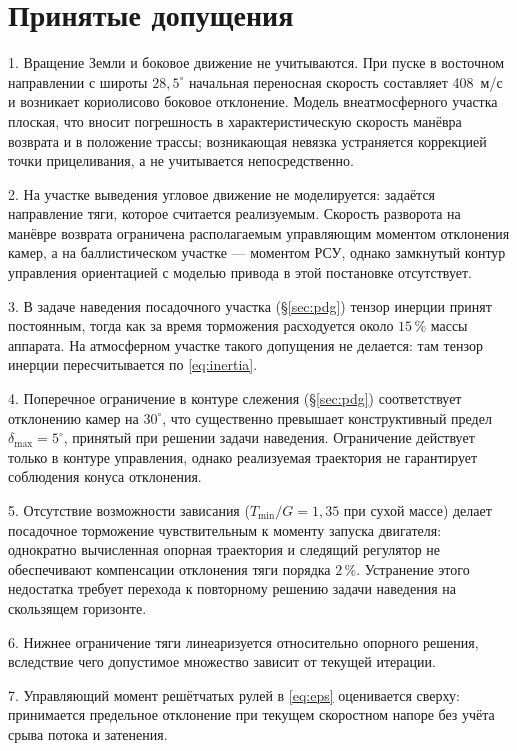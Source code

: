 \documentclass[11pt,a4paper]{article}
\begin{document}
\section{Принятые допущения}

1. Вращение Земли и боковое движение не учитываются. При пуске в восточном
направлении с широты $28{,}5^\circ$ начальная переносная скорость составляет
408~м/с и возникает кориолисово боковое отклонение. Модель внеатмосферного
участка плоская, что вносит погрешность в характеристическую скорость манёвра
возврата и в положение трассы; возникающая невязка устраняется коррекцией точки
прицеливания, а не учитывается непосредственно.

2. На участке выведения угловое движение не моделируется: задаётся направление
тяги, которое считается реализуемым. Скорость разворота на манёвре возврата
ограничена располагаемым управляющим моментом отклонения камер, а на
баллистическом участке — моментом РСУ, однако замкнутый контур управления
ориентацией с моделью привода в этой постановке отсутствует.

3. В задаче наведения посадочного участка (\S\ref{sec:pdg}) тензор инерции принят
постоянным, тогда как за время торможения расходуется около $15\,\%$ массы
аппарата. На атмосферном участке такого допущения не делается: там тензор
инерции пересчитывается по \eqref{eq:inertia}.

4. Поперечное ограничение в контуре слежения (\S\ref{sec:pdg}) соответствует
отклонению камер на $30^\circ$, что существенно превышает конструктивный предел
$\delta_{\max}=5^\circ$, принятый при решении задачи наведения. Ограничение
действует только в контуре управления, однако реализуемая траектория не
гарантирует соблюдения конуса отклонения.

5. Отсутствие возможности зависания ($T_{\min}/G=1{,}35$ при сухой массе) делает
посадочное торможение чувствительным к моменту запуска двигателя: однократно
вычисленная опорная траектория и следящий регулятор не обеспечивают компенсации
отклонения тяги порядка $2\,\%$. Устранение этого недостатка требует перехода к
повторному решению задачи наведения на скользящем горизонте.

6. Нижнее ограничение тяги линеаризуется относительно опорного решения,
вследствие чего допустимое множество зависит от текущей итерации.

7. Управляющий момент решётчатых рулей в \eqref{eq:eps} оценивается сверху:
принимается предельное отклонение при текущем скоростном напоре без учёта срыва
потока и затенения.
\end{document}
